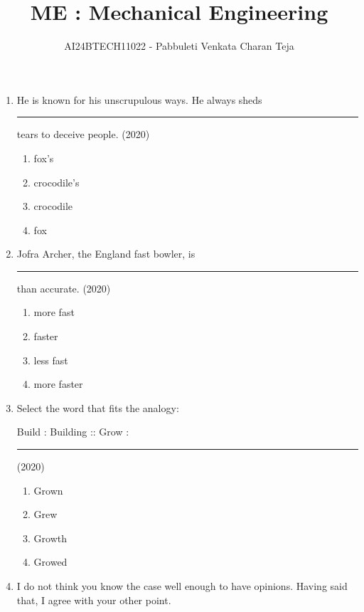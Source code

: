 \documentclass[journal]{IEEEtran}
\begin{document}

\vspace{3cm}

\title{ME : Mechanical Engineering}
\author{AI24BTECH11022 - Pabbuleti Venkata Charan Teja}
\maketitle

\renewcommand{\thefigure}{\theenumi}
\renewcommand{\thetable}{\theenumi}


\begin{enumerate}
\item He is known for his unscrupulous ways. He always sheds \rule{1cm}{0.15mm} tears to deceive people. \hfill(2020)
\begin{multicols}{2}
\begin{enumerate}
\item fox's
\item crocodile's
\item crocodile
\item fox
\end{enumerate}
\end{multicols}


\item Jofra Archer, the England fast bowler, is \rule{1cm}{0.15mm} than accurate. \hfill(2020)
\begin{multicols}{2}
\begin{enumerate}
\item more fast
\item faster
\item less fast
\item more faster
\end{enumerate}
\end{multicols}


\item Select the word that fits the analogy:

Build : Building :: Grow : \rule{1cm}{0.15mm} \hfill(2020)
\begin{multicols}{2}
\begin{enumerate}
\item Grown
\item Grew
\item Growth
\item Growed
\end{enumerate}
\end{multicols}


\item I do not think you know the case well enough to have opinions. Having said that, I agree with your other point.


\end{enumerate}
\end{document}
